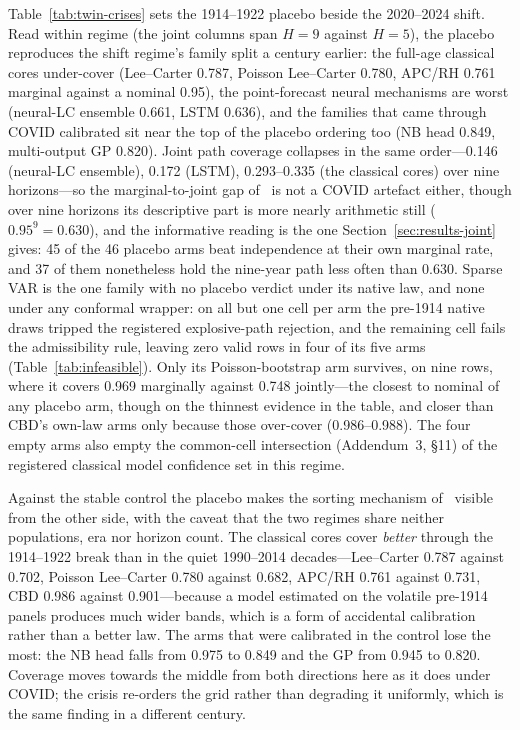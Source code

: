 Table~\ref{tab:twin-crises} sets the 1914--1922 placebo beside the
2020--2024 shift. Read within regime (the joint columns span $H=9$
against $H=5$), the placebo reproduces the shift regime's family split a
century earlier: the full-age classical cores under-cover (Lee--Carter
0.787, Poisson Lee--Carter 0.780, APC/RH 0.761 marginal against a
nominal 0.95), the point-forecast neural mechanisms are worst
(neural-LC ensemble 0.661, LSTM 0.636), and the families that came
through COVID calibrated sit near the top of the placebo ordering too
(NB head 0.849, multi-output GP 0.820). Joint path coverage collapses
in the same order---0.146 (neural-LC ensemble), 0.172 (LSTM),
0.293--0.335 (the classical cores) over nine horizons---so the
marginal-to-joint gap of \Hthree\ is not a COVID artefact either, though
over nine horizons its descriptive part is more nearly arithmetic still
($0.95^9 = 0.630$), and the informative reading is the one
Section~\ref{sec:results-joint} gives: 45 of the 46 placebo arms beat
independence at their own marginal rate, and 37 of them nonetheless hold
the nine-year path less often than 0.630. Sparse VAR is the one family
with no placebo verdict under its native law, and none under any conformal
wrapper: on all but one cell per arm the pre-1914 native draws tripped the
registered explosive-path rejection, and the remaining cell fails the
admissibility rule, leaving zero valid rows in four of its five arms
(Table~\ref{tab:infeasible}). Only its Poisson-bootstrap arm survives, on
nine rows, where it covers 0.969 marginally against 0.748 jointly---the
closest to nominal of any placebo arm, though on the thinnest evidence in
the table, and closer than CBD's own-law arms only because those
over-cover (0.986--0.988). The four empty arms also empty the common-cell intersection
(Addendum~3, \S11) of the registered classical model confidence set in
this regime.

Against the stable control the placebo makes the sorting mechanism of
\Htwo\ visible from the other side, with the caveat that the two regimes
share neither populations, era nor horizon count. The classical cores
cover \emph{better} through the 1914--1922 break than in the quiet
1990--2014 decades---Lee--Carter 0.787 against 0.702, Poisson Lee--Carter
0.780 against 0.682, APC/RH 0.761 against 0.731, CBD 0.986 against
0.901---because a model estimated on the volatile pre-1914 panels
produces much wider bands, which is a form of accidental calibration
rather than a better law. The arms that were calibrated in the control
lose the most: the NB head falls from 0.975 to 0.849 and the GP from
0.945 to 0.820. Coverage moves towards the middle from both directions
here as it does under COVID; the crisis re-orders the grid rather than
degrading it uniformly, which is the same finding in a different century.

